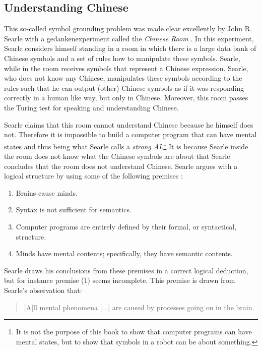 \subsection{Understanding Chinese}This so-called symbol grounding problem was made clear excellently by John R. Searle with a gedankenexperiment called the {\em Chinese Room} \citep{searle:1980}. In this experiment, Searle considers himself standing in a room in which there is a large data bank of Chinese symbols and a set of rules how to manipulate these symbols. Searle, while in the room receives symbols that represent a Chinese expression. Searle, who does not know any Chinese, manipulates these symbols according to the rules such that he can output (other) Chinese symbols as if it was responding correctly in a human like way, but only in Chinese. Moreover, this room passes the Turing test for speaking and understanding Chinese.

Searle claims that this room cannot understand Chinese because he himself does not. Therefore it is impossible to build a computer program that can have mental states and thus being what Searle calls a {\em strong AI}.\footnote{It is not the purpose of this book to show that computer programs can have mental states, but to show that symbols in a robot can be about something.} It is because Searle inside the room does not know what the Chinese symbols are about that Searle concludes that the room does not understand Chinese. Searle argues with a logical structure by using some of the following premises \cite[39]{searle:1984}:

\begin{enumerate}
\item Brains cause minds.
\item Syntax is not sufficient for semantics.
\item Computer programs are entirely defined by their formal, or syntactical, structure.
\item Minds have mental contents; specifically, they have semantic contents.
\end{enumerate}

Searle draws his conclusions from these premises in a correct logical deduction, but for instance premise (1) seems incomplete. This premise is drawn from Searle's observation that:

\begin{quote}
[A]ll mental phenomena [...] are caused by processes going on in the brain. \citep[18]{searle:1984}
\end{quote}

